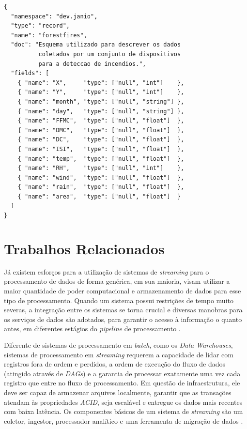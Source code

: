 \documentclass[12pt]{article}
\begin{document}
\begin{lstlisting}[]
{
  "namespace": "dev.janio", 
  "type": "record", 
  "name": "forestfires", 
  "doc": "Esquema utilizado para descrever os dados
          coletados por um conjunto de dispositivos
          para a deteccao de incendios.", 
  "fields": [ 
    { "name": "X",     "type": ["null", "int"]    }, 
    { "name": "Y",     "type": ["null", "int"]    }, 
    { "name": "month", "type": ["null", "string"] }, 
    { "name": "day",   "type": ["null", "string"] }, 
    { "name": "FFMC",  "type": ["null", "float"]  }, 
    { "name": "DMC",   "type": ["null", "float"]  }, 
    { "name": "DC",    "type": ["null", "float"]  }, 
    { "name": "ISI",   "type": ["null", "float"]  }, 
    { "name": "temp",  "type": ["null", "float"]  }, 
    { "name": "RH",    "type": ["null", "int"]    }, 
    { "name": "wind",  "type": ["null", "float"]  }, 
    { "name": "rain",  "type": ["null", "float"]  }, 
    { "name": "area",  "type": ["null", "float"]  } 
  ]
}
\end{lstlisting}

\section{Trabalhos Relacionados}
Já existem esforços para a utilização de sistemas de \textit{streaming} para o processamento de dados de forma genérica, em sua maioria, visam utilizar a maior quantidade de poder computacional e armazenamento de dados para esse tipo de processamento. Quando um sistema possui restrições de tempo muito severas, a integração entre os sistemas se torna crucial e diversas manobras para os serviços de dados são adotados, para garantir o acesso à informação o quanto antes, em diferentes estágios do \textit{pipeline} de processamento \cite{isah:18}.

Diferente de sistemas de processamento em \textit{batch}, como os \textit{Data Warehouses}, sistemas de processamento em \textit{streaming} requerem a capacidade de lidar com registros fora de ordem e perdidos, a ordem de execução do fluxo de dados (atingido através de \textit{DAGs}) e a garantia de processar exatamente uma vez cada registro que entre no fluxo de processamento. Em questão de infraestrutura, ele deve ser capaz de armazenar arquivos localmente, garantir que as transações atendam às propriedades \textit{ACID}, seja escalável e entregue os dados mais recentes com baixa latência. Os componentes básicos de um sistema de \textit{streaming} são um coletor, ingestor, processador analítico e uma ferramenta de migração de dados \cite{meehan:17}.
\end{document}
